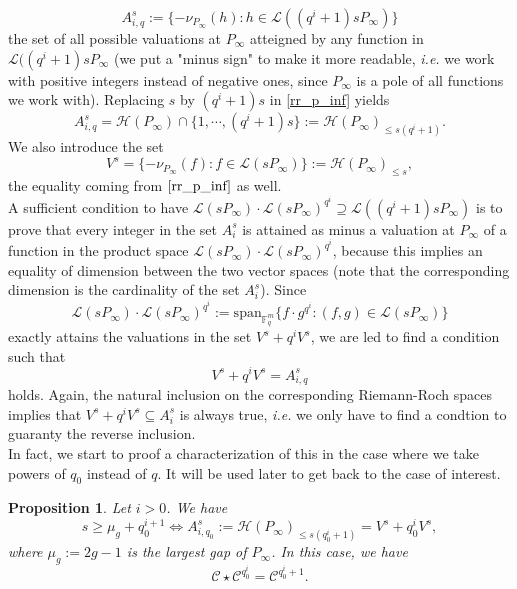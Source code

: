 \documentclass[a4paper]{article}
\newtheorem{prop1}{Proposition}
\newcommand{\calH}{\mathcal{H}}
\newcommand{\calL}{\mathcal{L}}
\newcommand{\calC}{\mathcal{C}}
\begin{document}
\[A^s_{i,q}:=\{-\nu_{P_{\infty}}(h) : h \in \calL((q^i+1)sP_{\infty}) \}\] 
the set of all possible valuations at $P_{\infty}$ atteigned by any function in $\calL((q^i+1)sP_{\infty}$ (we put a "minus sign" to make it more readable, \emph{i.e.} we work with positive integers instead of negative ones, since $P_{\infty}$ is a pole of all functions we work with). Replacing $s$ by $(q^i+1)s$ in \eqref{rr_p_inf} yields
\[A^s_{i,q} = \calH(P_{\infty}) \cap \{1,\cdots,(q^i+1)s\} := \calH(P_{\infty})_{\leq s(q^i+1)}.\]
 We also introduce the set 
\[V^s = \{-\nu_{P_{\infty}}(f) : f \in \calL(sP_{\infty})\} := \calH(P_{\infty})_{\leq s},\]
the equality coming from $\eqref{rr_p_inf}$ as well. \\
A sufficient condition to have $\calL(sP_{\infty}) \cdot \calL(sP_{\infty})^{q^i} \supseteq \calL((q^i+1)sP_{\infty})$ is to prove that every integer in the set $A_i^s$ is attained as minus a valuation at $P_{\infty}$ of a function in the product space $\calL(sP_{\infty}) \cdot \calL(sP_{\infty})^{q^i}$, because this implies an equality of dimension between the two vector spaces (note that the corresponding dimension is the cardinality of the set $A_i^s$). Since 
\[\calL(sP_{\infty}) \cdot \calL(sP_{\infty})^{q^i} := \mathrm{span}_{\mathbb{F}_q^m}\{f \cdot g^{q^i} : (f,g) \in \calL(sP_{\infty})\}\]
exactly attains the valuations in the set $V^s+q^iV^s$,
we are led to find a condition such that 
\begin{equation} \label{equalitu_of_valuations}
    V^s+q^iV^s = A^s_{i,q}
\end{equation}
holds. Again, the natural inclusion on the corresponding Riemann-Roch spaces implies that  $V^s+q^iV^s \subseteq A^s_i$ is always true, \emph{i.e.} we only have to find a condtion to guaranty the reverse inclusion. \\
In fact, we start to proof a characterization of this in the case where we take powers of $q_0$ instead of $q$. It will be used later to get back to the case of interest.

\begin{prop1} \label{result_with_valuations}
Let $i > 0$. We have 
\[s \geq \mu_g + q_0^{i+1} \iff A^s_{i,q_0} := \calH(P_{\infty})_{\leq s(q_0^i+1)} = V^s+q_0^iV^s,\]
 where $\mu_g := 2g-1$ is the largest gap of $P_{\infty}$. In this case, we have 
 \[ \calC \star \calC^{q_0^i} = \calC^{q_0^i+1}.\]
\end{prop1}
\end{document}
